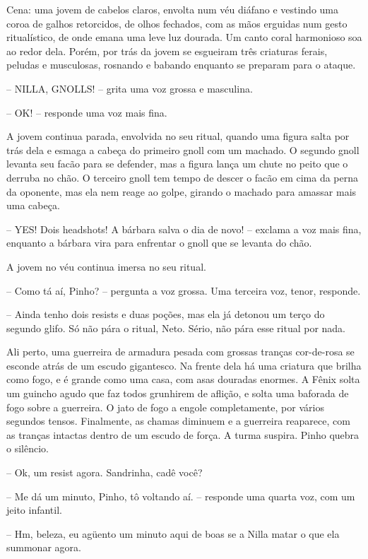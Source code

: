 

Cena: uma jovem de cabelos claros, envolta num véu diáfano e vestindo uma coroa de galhos retorcidos,
de olhos fechados, com as mãos erguidas num gesto ritualístico, de onde emana uma leve luz dourada.
Um canto coral harmonioso soa ao redor dela. Porém, por trás da jovem se esgueiram três criaturas
ferais, peludas e musculosas, rosnando e babando enquanto se preparam para o ataque.

-- NILLA, GNOLLS! -- grita uma voz grossa e masculina.

-- OK! -- responde uma voz mais fina.

A jovem continua parada, envolvida no seu ritual, quando uma figura salta por trás dela e esmaga a cabeça do primeiro gnoll
com um machado. O segundo gnoll levanta seu facão para se defender, mas a figura lança um chute no peito que o derruba no chão.
O terceiro gnoll tem tempo de descer o facão em cima da perna da oponente, mas ela nem reage ao golpe, girando o machado para
amassar mais uma cabeça. 

-- YES! Dois headshots! A bárbara salva o dia de novo! -- exclama a voz mais fina, enquanto a bárbara vira para enfrentar o gnoll que se levanta do chão.

A jovem no véu continua imersa no seu ritual.

-- Como tá aí, Pinho? -- pergunta a voz grossa. Uma terceira voz, tenor, responde.

-- Ainda tenho dois resists e duas poções, mas ela já detonou um terço do segundo glifo. 
Só não pára o ritual, Neto. Sério, não pára esse ritual por nada.

Ali perto, uma guerreira de armadura pesada com grossas tranças cor-de-rosa se esconde atrás de um escudo gigantesco. 
Na frente dela há uma criatura que brilha como fogo, e é grande como uma casa, com asas douradas enormes.
A Fênix solta um guincho agudo que faz todos grunhirem de aflição, e solta uma baforada de fogo sobre a guerreira.
O jato de fogo a engole completamente, por vários segundos tensos. Finalmente, as chamas diminuem e a guerreira reaparece,
com as tranças intactas dentro de um escudo de força. A turma suspira. Pinho quebra o silêncio.

-- Ok, um resist agora. Sandrinha, cadê você?

-- Me dá um minuto, Pinho, tô voltando aí. -- responde uma quarta voz, com um jeito infantil.

-- Hm, beleza, eu agüento um minuto aqui de boas se a Nilla matar o que ela summonar agora.

